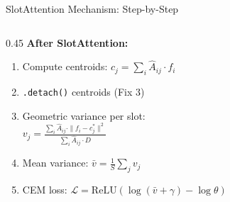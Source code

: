 \documentclass[aspectratio=169, 10pt]{beamer}
\newcommand{\code}[1]{\texttt{\small #1}}
\begin{document}
\begin{frame}{SlotAttention Mechanism: Step-by-Step}
\begin{columns}[T]
\begin{column}{0.45\textwidth}
\vspace{0.15cm}
\textbf{After SlotAttention:}
\scriptsize
\begin{enumerate}\setlength{\itemsep}{1pt}
    \item Compute centroids: $c_j = \sum_i \hat{A}_{ij} \cdot f_i$
    \item \code{.detach()} centroids (Fix 3)
    \item Geometric variance per slot:\\
    $v_j = \frac{\sum_i \hat{A}_{ij} \cdot \|f_i - c_j^*\|^2}{\sum_i \hat{A}_{ij} \cdot D}$
    \item Mean variance: $\bar{v} = \frac{1}{S}\sum_j v_j$
    \item CEM loss: $\mathcal{L} = \text{ReLU}(\log(\bar{v}+\gamma) - \log\theta)$
\end{enumerate}
\end{column}
\end{columns}

\end{frame}
\end{document}
